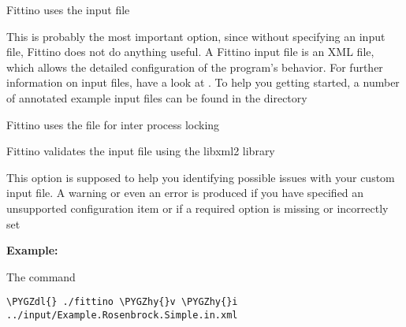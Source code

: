 \documentclass[letterpaper,10pt,english]{sphinxmanual}
\def\PYGZdl{\char`\$}
\def\PYGZhy{\char`\-}
\begin{document}

\begin{fulllineitems}
\label{basic_usage:cmdoption-i}
Fittino uses the input file 

This is probably the most important option, since without specifying an input file, Fittino does
not do anything useful. A Fittino input file is an XML file, which allows the detailed
configuration of the program's behavior. For further information on input files, have a look at
{\hyperref[input_files:input-files]{\emph{}}}. To help you getting started, a number of annotated example input files can be
found in the  directory

\end{fulllineitems}


\begin{fulllineitems}
\label{basic_usage:cmdoption-l}
Fittino uses the file  for inter process locking

\end{fulllineitems}


\begin{fulllineitems}
\label{basic_usage:cmdoption-v}
Fittino validates the input file using the libxml2 library

This option is supposed to help you identifying possible issues with your custom input file.
A warning or even an error is produced if you have specified an unsupported configuration item
or if a required option is missing or incorrectly set

\end{fulllineitems}


\textbf{Example:}

The command

\begin{Verbatim}[commandchars=\\\{\}]
\PYGZdl{} ./fittino \PYGZhy{}v \PYGZhy{}i ../input/Example.Rosenbrock.Simple.in.xml
\end{Verbatim}
\end{document}

